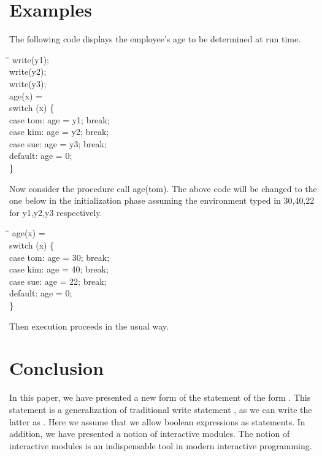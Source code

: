 \documentclass[12pt]{article}
\newenvironment{exmple}{
 \begingroup \begin{tabbing} \hspace{2em}\= \hspace{3em}\= \hspace{3em}\=
\hspace{3em}\= \hspace{3em}\= \hspace{3em}\= \kill}{
 \end{tabbing}\endgroup}
\begin{document}
\section{Examples }\label{sec:modules}

The following  code displays the employee's age to be determined at run time.

\begin{exmple}
 write(y1); \\
 write(y2); \\
 write(y3); \\
 age(x) =  \\
  \>      switch (x) \{ \\
 \>           case tom:  age = y1;   break; \\
  \>          case kim: age = y2;   break;\\
 \>           case sue: age = y3;    break;\\
 \>           default: age = 0;          \\
        \}\\
\end{exmple}

Now consider the procedure call age(tom). The above code will be changed to the one below in the initialization phase assuming
the environment typed in 30,40,22 for y1,y2,y3 respectively.

\begin{exmple}
 age(x) =  \\
\>        switch (x) \{ \\
 \>           case tom:  age = 30;   break; \\
  \>          case kim: age = 40;   break;\\
 \>           case sue: age = 22;    break;\\
 \>           default: age = 0;          \\
        \}\\
\end{exmple}


\noindent Then execution proceeds in the usual way.




\section{Conclusion}\label{sec:conc}

In this paper, we have presented a new form of the  statement of the form .
This statement is a generalization of traditional write statement 
, as we can write the latter as . Here we assume that
 we allow boolean expressions as statements.
In addition, we have presented a notion of  interactive
 modules.  The notion of interactive modules is an indispensable tool in
modern interactive programming.
\end{document}
